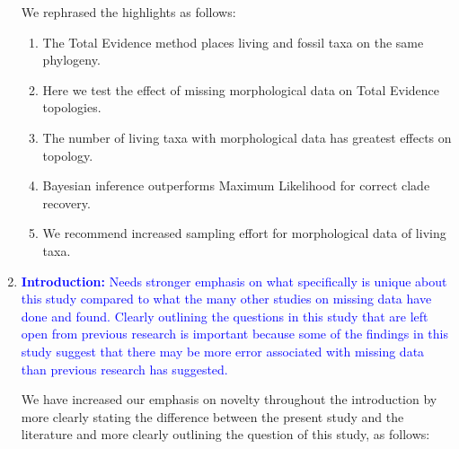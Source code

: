 \documentclass[12pt,letterpaper]{article}
\begin{document}
\begin{enumerate}
We rephrased the highlights as follows: %

\begin{enumerate}[(1)]
\item The Total Evidence method places living and fossil taxa on the same phylogeny.
\item Here we test the effect of missing morphological data on Total Evidence topologies.
\item The number of living taxa with morphological data has greatest effects on topology.
\item Bayesian inference outperforms Maximum Likelihood for correct clade recovery.
\item We recommend increased sampling effort for morphological data of living taxa.
\end{enumerate}


\item{\textcolor{blue}{\textbf{Introduction:} Needs stronger emphasis on what specifically is unique about this study compared to what the many other studies on missing data have done and found.
Clearly outlining the questions in this study that are left open from previous research is important because some of the findings in this study suggest that there may be more error associated with missing data than previous research has suggested.}}

We have increased our emphasis on novelty throughout the introduction by more clearly stating the difference between the present study and the literature and more clearly outlining the question of this study, as follows:




\end{enumerate}
\end{document}
